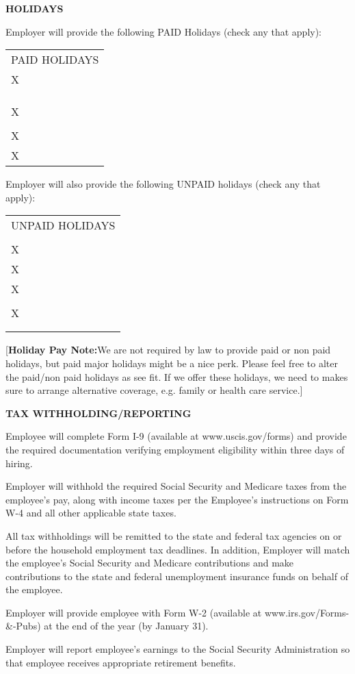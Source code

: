 \documentclass[]{article}
\begin{document}
\textbf{HOLIDAYS}

Employer will provide the following PAID Holidays (check any that
apply):

\begin{longtable}[c]{@{}l@{}}
\toprule
PAID HOLIDAYS\tabularnewline
X\tabularnewline
\tabularnewline
\tabularnewline
\tabularnewline
X\tabularnewline
\tabularnewline
X\tabularnewline
X\tabularnewline
\bottomrule
\end{longtable}

Employer will also provide the following UNPAID holidays (check any that
apply):

\begin{longtable}[c]{@{}l@{}}
\toprule
UNPAID HOLIDAYS\tabularnewline
\tabularnewline
X\tabularnewline
X\tabularnewline
X\tabularnewline
\tabularnewline
X\tabularnewline
\tabularnewline
\tabularnewline
\bottomrule
\end{longtable}

{[}\textbf{Holiday Pay Note:}We are not required by law to provide paid
or non paid holidays, but paid major holidays might be a nice perk.
Please feel free to alter the paid/non paid holidays as see fit. If we
offer these holidays, we need to makes sure to arrange alternative
coverage, e.g. family or health care service.{]}

\textbf{TAX WITHHOLDING/REPORTING}

Employee will complete Form I-9 (available at www.uscis.gov/forms) and
provide the required documentation verifying employment eligibility
within three days of hiring.

Employer will withhold the required Social Security and Medicare taxes
from the employee's pay, along with income taxes per the Employee's
instructions on Form W-4 and all other applicable state taxes.

All tax withholdings will be remitted to the state and federal tax
agencies on or before the household employment tax deadlines. In
addition, Employer will match the employee's Social Security and
Medicare contributions and make contributions to the state and federal
unemployment insurance funds on behalf of the employee.

Employer will provide employee with Form W-2 (available at
www.irs.gov/Forms-\&-Pubs) at the end of the year (by January 31).

Employer will report employee's earnings to the Social Security
Administration so that employee receives appropriate retirement
benefits.
\end{document}
